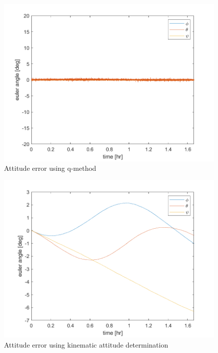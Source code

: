 \begin{figure}[H]
\centering
\includegraphics[scale=0.6]{Images/ps7_problem2_qMethod.png}
\caption{Attitude error using q-method}
\label{fig:ps7_problem2_qMethod}
\end{figure}

\begin{figure}[H]
\centering
\includegraphics[scale=0.6]{Images/ps7_problem2_kin.png}
\caption{Attitude error using kinematic attitude determination}
\label{fig:ps7_problem2_kin}
\end{figure}

